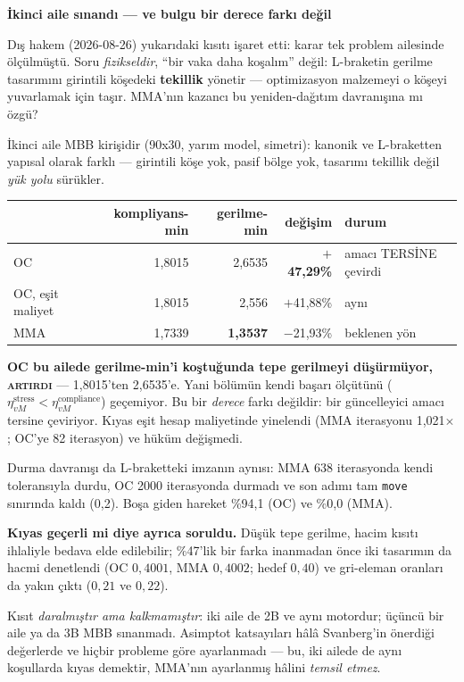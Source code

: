 \documentclass[11pt,a4paper]{article}
\newcommand{\kkkenar}{lacivert}
\newcommand{\kkzemin}{kod}
\newenvironment{renkkutu}[3]{%
  \renewcommand{\kkkenar}{#1}\renewcommand{\kkzemin}{#2}%
  \par\medskip\noindent
  \begin{lrbox}{\kutugovde}%
  \begin{minipage}{\dimexpr\linewidth-2\fboxsep-2\fboxrule\relax}\footnotesize
  \textcolor{#1}{\textbf{#3}}\par\vspace{3pt}%
}{%
  \end{minipage}%
  \end{lrbox}%
  \noindent\fcolorbox{\kkkenar}{\kkzemin}{\usebox{\kutugovde}}%
  \par\medskip
}
\newenvironment{olculdu}[1]{\begin{renkkutu}{iyi}{iyibg}{#1}}{\end{renkkutu}}
\begin{document}
\begin{olculdu}{İkinci aile sınandı --- ve bulgu bir derece farkı değil}
\label{sub:mma-ikinci-aile}
Dış hakem (2026-08-26) yukarıdaki kısıtı işaret etti: karar tek problem
ailesinde ölçülmüştü. Soru \emph{fizikseldir}, ``bir vaka daha koşalım''
değil: L-braketin gerilme tasarımını girintili köşedeki \textbf{tekillik}
yönetir --- optimizasyon malzemeyi o köşeyi yuvarlamak için taşır. MMA'nın
kazancı bu yeniden-dağıtım davranışına mı özgü?

\noindent İkinci aile MBB kirişidir (90x30, yarım model, simetri):
kanonik ve L-braketten yapısal olarak farklı --- girintili köşe yok, pasif
bölge yok, tasarımı tekillik değil \emph{yük yolu} sürükler.

\begin{center}\footnotesize
\begin{tabular}{@{}lrrrl@{}}
\toprule
 & kompliyans-min & gerilme-min & değişim & durum \\
\midrule
OC & 1{,}8015 & 2{,}6535 & \textbf{$+$47{,}29\%} & amacı TERSİNE çevirdi \\
OC, eşit maliyet & 1{,}8015 & 2{,}556 & $+$41{,}88\% & aynı \\
MMA & 1{,}7339 & \textbf{1{,}3537} & $-$21{,}93\% & beklenen yön \\
\bottomrule
\end{tabular}
\end{center}

\noindent \textbf{OC bu ailede gerilme-min'i koştuğunda tepe gerilmeyi
düşürmüyor, \textsc{artırdı}} --- 1{,}8015'ten 2{,}6535'e.
Yani bölümün kendi başarı ölçütünü ($\eta_{vM}^{\text{stress}} <
\eta_{vM}^{\text{compliance}}$) geçemiyor. Bu bir \emph{derece} farkı
değildir: bir güncelleyici amacı tersine çeviriyor. Kıyas eşit hesap
maliyetinde yinelendi (MMA iterasyonu 1{,}021$\times$; OC'ye
82 iterasyon) ve hüküm değişmedi.

\noindent Durma davranışı da L-braketteki imzanın aynısı: MMA 638
iterasyonda kendi toleransıyla durdu, OC 2000 iterasyonda durmadı ve
son adımı tam \texttt{move} sınırında kaldı (0{,}2). Boşa giden
hareket \%94{,}1 (OC) ve \%0{,}0 (MMA).

\noindent \textbf{Kıyas geçerli mi diye ayrıca soruldu.} Düşük tepe gerilme,
hacim kısıtı ihlaliyle bedava elde edilebilir; \%47'lik bir farka inanmadan
önce iki tasarımın da hacmi denetlendi (OC $0{,}4001$, MMA $0{,}4002$; hedef
$0{,}40$) ve gri-eleman oranları da yakın çıktı ($0{,}21$ ve $0{,}22$).

\noindent Kısıt \emph{daralmıştır ama kalkmamıştır}: iki aile de 2B ve aynı
motordur; üçüncü bir aile ya da 3B MBB sınanmadı. Asimptot katsayıları hâlâ
Svanberg'in önerdiği değerlerde ve hiçbir probleme göre ayarlanmadı --- bu,
iki ailede de aynı koşullarda kıyas demektir, MMA'nın ayarlanmış hâlini
\emph{temsil etmez}.
\end{olculdu}
\end{document}
